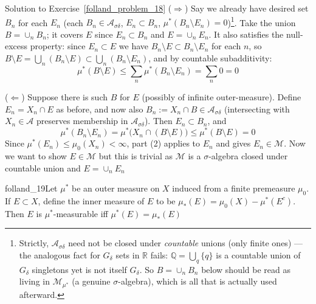\begin{mystsolution}{Solution to Exercise~\ref{folland_problem_18}}
($\Longrightarrow$)  Say we already have desired set $B_n$ for each $E_n$ (each $B_n\in \mathcal A_{\sigma\delta}$, $E_n\subset B_n$, $\mu^*(B_n\setminus E_n)=0$)\footnote{Strictly, $\mathcal A_{\sigma\delta}$ need not be closed under \textit{countable} unions (only finite ones) --- the analogous fact for $G_\delta$ sets in $\mathbb R$ fails: $\mathbb Q=\bigcup_q \{q\}$ is a countable union of $G_\delta$ singletons yet is not itself $G_\delta$. So $B=\cup_n B_n$ below should be read as living in $\mathcal M_{\mu^*}$ (a genuine $\sigma$-algebra), which is all that is actually used afterward.}. Take the union $B=\cup_n B_n$; it covers $E$ since $E_n \subset B_n$ and $E=\cup_n E_n$. It also satisfies the null-excess property: since $E_n \subset E$ we have $B_n\setminus E \subset B_n \setminus E_n$ for each $n$, so $B\setminus E = \bigcup_n(B_n\setminus E) \subset \bigcup_n(B_n\setminus E_n)$, and by countable subadditivity:
\begin{equation}
\mu^*(B\setminus E) \leq \sum_n \mu^*(B_n\setminus E_n) = \sum_n 0 = 0
\end{equation}

($\Longleftarrow$) Suppose there is such $B$ for $E$ (possibly of infinite outer-measure). Define $E_n = X_n\cap E$ as before, and now also $B_n := X_n \cap B \in \mathcal A_{\sigma\delta}$ (intersecting with $X_n \in \mathcal A$ preserves membership in $\mathcal A_{\sigma\delta}$). Then $E_n \subset B_n$, and
\begin{equation}
\mu^*(B_n\setminus E_n) = \mu^*\big(X_n\cap(B\setminus E)\big) \leq \mu^*(B\setminus E) = 0
\end{equation}
Since $\mu^*(E_n)\leq \mu_0(X_n)<\infty$, part (2) applies to $E_n$ and gives $E_n \in \mathcal M$. Now we want to show $E \in \mathcal M$ but this is trivial as $\mathcal M$ is a $\sigma$-algebra closed under countable union and $E= \cup_n E_n$

\end{mystsolution}
\begin{mystexercise}{}{folland_19}\label{folland_19}Let $\mu^*$ be an outer measure on $X$ induced from a finite premeasure $\mu_0$. If $E \subset X$, define the inner measure of $E$ to be $\mu_*(E) = \mu_0(X) - \mu^*(E^c)$. Then $E$ is $\mu^*$-measurable iff $\mu^*(E) = \mu_*(E)$

\end{mystexercise}

